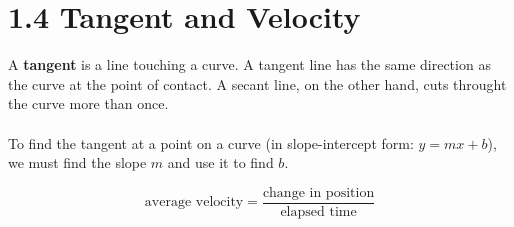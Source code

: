 %
%

\section*{1.4 Tangent and Velocity} 

A \textbf{tangent} is a line touching a curve. A tangent line has the same direction as the curve at the point of contact. A secant line, on the other hand, cuts throught the curve more than once.
\\\\
To find the tangent at a point on a curve (in slope-intercept form: \(y=mx+b\)), we must find the slope \(m\) and use it to find \(b\). 

$$\text{average velocity} = \frac{\text{change in position}}{\text{elapsed time}}$$ 
